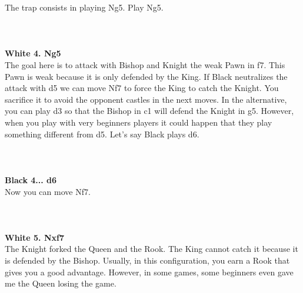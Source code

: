 \documentclass{article}
\begin{document}
The trap consists in playing Ng5. Play Ng5.\\
\\

\\
\\
\textbf{White 4. Ng5}\\
The goal here is to attack with Bishop and Knight the weak Pawn in f7. This Pawn is weak because it is only defended by the King.
If Black neutralizes the attack with d5 we can move Nf7 to force the King to catch the Knight. You sacrifice it to avoid the opponent castles in the next moves. In the alternative, you can play d3 so that the Bishop in c1 will defend the Knight in g5.
However, when you play with very beginners players it could happen that they play something different from d5.
Let's say Black plays d6.\\
\\

\\
\\
\textbf{Black 4... d6}\\
Now you can move Nf7.\\
\\

\\
\\
\textbf{White 5. Nxf7}\\
The Knight forked the Queen and the Rook. The King cannot catch it because it is defended by the Bishop.
Usually, in this configuration, you earn a Rook that gives you a good advantage. However, in some games, some beginners even gave me the Queen losing the game.\\
\\
\end{document}
